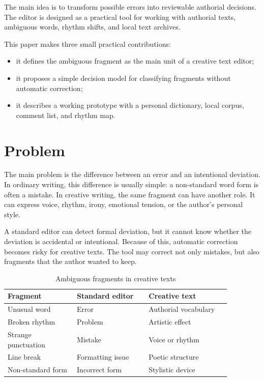 \documentclass[sigconf]{acmart}
\begin{document}
The main idea is to transform possible errors into reviewable authorial decisions. The editor is designed as a practical tool for working with authorial texts, ambiguous words, rhythm shifts, and local text archives.

This paper makes three small practical contributions:
\begin{itemize}
    \item it defines the ambiguous fragment as the main unit of a creative text editor;
    \item it proposes a simple decision model for classifying fragments without automatic correction;
    \item it describes a working prototype with a personal dictionary, local corpus, comment list, and rhythm map.
\end{itemize}

\section{Problem}

The main problem is the difference between an error and an intentional deviation. In ordinary writing, this difference is usually simple: a non-standard word form is often a mistake. In creative writing, the same fragment can have another role. It can express voice, rhythm, irony, emotional tension, or the author's personal style.

A standard editor can detect formal deviation, but it cannot know whether the deviation is accidental or intentional. Because of this, automatic correction becomes risky for creative texts. The tool may correct not only mistakes, but also fragments that the author wanted to keep.

\begin{table}[h]
\caption{Ambiguous fragments in creative texts}
\label{tab:ambiguous-fragments}
\begin{tabular}{p{0.27\linewidth}p{0.28\linewidth}p{0.32\linewidth}}
\toprule
Fragment & Standard editor & Creative text \\
\midrule
Unusual word & Error & Authorial vocabulary \\
Broken rhythm & Problem & Artistic effect \\
Strange punctuation & Mistake & Voice or rhythm \\
Line break & Formatting issue & Poetic structure \\
Non-standard form & Incorrect form & Stylistic device \\
\bottomrule
\end{tabular}
\end{table}
\end{document}
